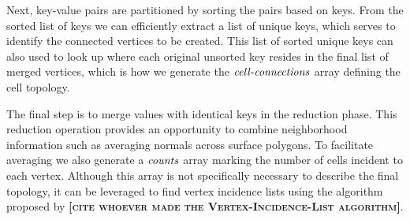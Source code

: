 \documentclass[10pt,journal,cspaper,compsoc]{IEEEtran}
\newcommand{\fix}[1]{{\color{red}\textbf{\textsc{[#1]}}}}
\begin{document}
Next, key-value pairs are partitioned by sorting the pairs based on keys.
From the sorted list of keys we can efficiently extract a list of unique
keys, which serves to identify the connected vertices to be created.  This
list of sorted unique keys can also used to look up where each original
unsorted key resides in the final list of merged vertices, which is how we
generate the $\id{cell-connections}$ array defining the cell topology.

The final step is to merge values with identical keys in the reduction
phase.  This reduction operation provides an opportunity to combine
neighborhood information such as averaging normals across surface polygons.
To facilitate averaging we also generate a $\id{counts}$ array marking
the number of cells incident to each vertex.  Although this array is not
specifically necessary to describe the final topology, it can be leveraged
to find vertex incidence lists using the algorithm proposed by \fix{cite
  whoever made the Vertex-Incidence-List algorithm}.


\end{document}
